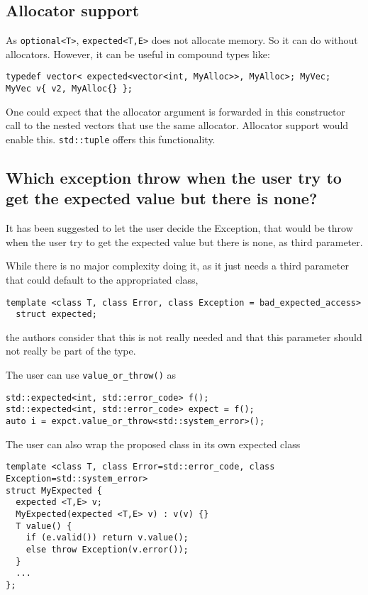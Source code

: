 \documentclass[a4paper,10pt]{article}
\newcommand{\cpp}[1]{\lstinline{#1}}
\begin{document}
\subsection{Allocator support}

As \cpp{optional<T>},  \cpp{expected<T,E>} does not allocate memory. So it can do without allocators. However, it can be useful in compound types like:

\begin{lstlisting}
typedef vector< expected<vector<int, MyAlloc>>, MyAlloc>; MyVec;
MyVec v{ v2, MyAlloc{} };
\end{lstlisting}

One could expect that the allocator argument is forwarded in this constructor call to the nested vectors that use the same allocator. Allocator support would enable this. \cpp{std::tuple} offers this functionality.

\subsection{Which exception throw when the user try to get the expected value but there is none?}

It has been suggested to let the user decide the Exception, that would be throw when the user try to get the expected value but there is none, as third parameter. 

While there is no major complexity doing it, as it just needs a third parameter that could default to the appropriated class, 

\begin{lstlisting}
template <class T, class Error, class Exception = bad_expected_access>
  struct expected;
\end{lstlisting}

the authors consider that this is not really needed and that this parameter should not really be part of the type.

The user can use \cpp{value_or_throw()} as

\begin{lstlisting}
std::expected<int, std::error_code> f();
std::expected<int, std::error_code> expect = f();
auto i = expct.value_or_throw<std::system_error>();  
\end{lstlisting}

The user can also wrap the proposed class in its own expected class

\begin{lstlisting}
template <class T, class Error=std::error_code, class Exception=std::system_error>
struct MyExpected {
  expected <T,E> v;
  MyExpected(expected <T,E> v) : v(v) {}
  T value() {  
    if (e.valid()) return v.value();
    else throw Exception(v.error());
  }
  ...
};
\end{lstlisting}
\end{document}
